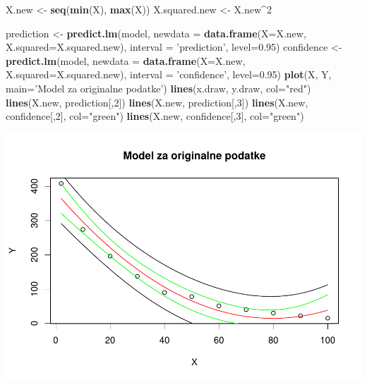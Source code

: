 \documentclass[]{article}
\newenvironment{Shaded}{\begin{snugshade}}{\end{snugshade}}
\newcommand{\KeywordTok}[1]{\textcolor[rgb]{0.13,0.29,0.53}{\textbf{{#1}}}}
\newcommand{\DataTypeTok}[1]{\textcolor[rgb]{0.13,0.29,0.53}{{#1}}}
\newcommand{\DecValTok}[1]{\textcolor[rgb]{0.00,0.00,0.81}{{#1}}}
\newcommand{\FloatTok}[1]{\textcolor[rgb]{0.00,0.00,0.81}{{#1}}}
\newcommand{\StringTok}[1]{\textcolor[rgb]{0.31,0.60,0.02}{{#1}}}
\newcommand{\NormalTok}[1]{{#1}}
\begin{document}
\begin{Shaded}
\begin{Highlighting}[]
\NormalTok{X.new <-}\StringTok{ }\KeywordTok{seq}\NormalTok{(}\KeywordTok{min}\NormalTok{(X), }\KeywordTok{max}\NormalTok{(X))}
\NormalTok{X.squared.new <-}\StringTok{ }\NormalTok{X.new^}\DecValTok{2}

\NormalTok{prediction <-}\StringTok{ }\KeywordTok{predict.lm}\NormalTok{(model, }\DataTypeTok{newdata =} \KeywordTok{data.frame}\NormalTok{(}\DataTypeTok{X=}\NormalTok{X.new, }\DataTypeTok{X.squared=}\NormalTok{X.squared.new),}
                         \DataTypeTok{interval =} \StringTok{'prediction'}\NormalTok{, }\DataTypeTok{level=}\FloatTok{0.95}\NormalTok{)}
\NormalTok{confidence <-}\StringTok{ }\KeywordTok{predict.lm}\NormalTok{(model, }\DataTypeTok{newdata =} \KeywordTok{data.frame}\NormalTok{(}\DataTypeTok{X=}\NormalTok{X.new, }\DataTypeTok{X.squared=}\NormalTok{X.squared.new),}
                         \DataTypeTok{interval =} \StringTok{'confidence'}\NormalTok{, }\DataTypeTok{level=}\FloatTok{0.95}\NormalTok{)}
\KeywordTok{plot}\NormalTok{(X, Y, }\DataTypeTok{main=}\StringTok{'Model za originalne podatke'}\NormalTok{)}
\KeywordTok{lines}\NormalTok{(x.draw, y.draw, }\DataTypeTok{col=}\StringTok{"red"}\NormalTok{)}
\KeywordTok{lines}\NormalTok{(X.new, prediction[,}\DecValTok{2}\NormalTok{])}
\KeywordTok{lines}\NormalTok{(X.new, prediction[,}\DecValTok{3}\NormalTok{])}
\KeywordTok{lines}\NormalTok{(X.new, confidence[,}\DecValTok{2}\NormalTok{], }\DataTypeTok{col=}\StringTok{"green"}\NormalTok{)}
\KeywordTok{lines}\NormalTok{(X.new, confidence[,}\DecValTok{3}\NormalTok{], }\DataTypeTok{col=}\StringTok{"green"}\NormalTok{)}
\end{Highlighting}
\end{Shaded}

\includegraphics{Izvjestaj_files/figure-latex/unnamed-chunk-16-1.pdf}
\end{document}
